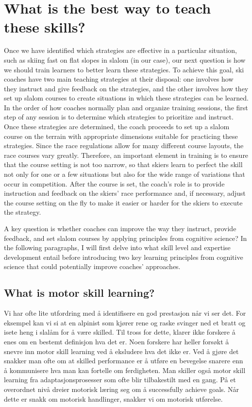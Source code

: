 \documentclass{report}
\begin{document}
\section{What is the best way to teach these skills?}
Once we have identified which strategies are effective in a particular situation, such as skiing fast on flat slopes in slalom (in our case), our next question is how we should train learners to better learn these strategies. To achieve this goal, ski coaches have two main teaching strategies at their disposal: one involves how they instruct and give feedback on the strategies, and the other involves how they set up slalom courses to create situations in which these strategies can be learned. In the order of how coaches normally plan and organize training sessions, the first step of any session is to determine which strategies to prioritize and instruct. Once these strategies are determined, the coach proceeds to set up a slalom course on the terrain with appropriate dimensions suitable for practicing these strategies. Since the race regulations allow for many different course layouts, the race courses vary greatly. Therefore, an important element in training is to ensure that the course setting is not too narrow, so that skiers learn to perfect the skill not only for one or a few situations but also for the wide range of variations that occur in competition. After the course is set, the coach's role is to provide instruction and feedback on the skiers' race performance and, if necessary, adjust the course setting on the fly to make it easier or harder for the skiers to execute the strategy. 

A key question is whether coaches can improve the way they instruct, provide feedback, and set slalom courses by applying principles from cognitive science? In the following paragraphs, I will first delve into what skill level and expertise development entail before introducing two key learning principles from cognitive science that could potentially improve coaches' approaches. 


\subsection{What is motor skill learning?}
Vi har ofte lite utfordring med å identifisere en god prestasjon når vi ser det. For eksempel kan vi si at en alpinist som kjører rene og raske svinger ned et bratt og isete heng i slalåm for å være skilled. Til tross for dette, klarer ikke forskere å enes om en bestemt definisjon hva det er. Noen forskere har heller forsøkt å snevre inn motor skill learning ved å eksludere hva det ikke er. Ved å gjøre det snakker man ofte om at skilled performance er å utføre en bevegelse snarere enn å kommunisere hva man kan fortelle om ferdigheten. Man skiller også motor skill learning fra adaptasjonsprosesser som ofte blir tilbakestilt med en gang. På et overordnet nivå dreier motorisk læring seg om å successfully achieve goals. Når dette er snakk om motorisk handlinger, snakker vi om motorisk utførelse.
\end{document}
